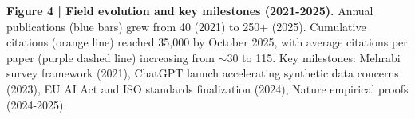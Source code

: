 \documentclass[11pt]{article}
\begin{document}
\textbf{Figure 4 | Field evolution and key milestones (2021-2025).} Annual publications (blue bars) grew from 40 (2021) to 250+ (2025). Cumulative citations (orange line) reached 35,000 by October 2025, with average citations per paper (purple dashed line) increasing from $\sim$30 to 115. Key milestones: Mehrabi survey framework (2021), ChatGPT launch accelerating synthetic data concerns (2023), EU AI Act and ISO standards finalization (2024), Nature empirical proofs (2024-2025).
\end{document}
